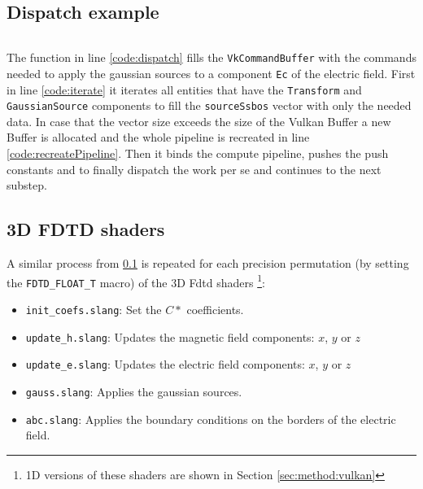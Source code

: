 \documentclass[../main.tex]{subfiles}
\begin{document}
\subsection{Dispatch example} \label{subsection:dispatch}

\inputminted[bgcolor=codeBg, tabsize=4, breaklines=true, linenos=true, escapeinside=||]{cpp}{\subfix{gauss.cpp}}

The function in line \ref{code:dispatch} fills the \texttt{VkCommandBuffer} with the commands needed to apply the gaussian sources to a component \texttt{Ec} of the electric field.
First in line \ref{code:iterate} it iterates all entities that have the \texttt{Transform} and \texttt{GaussianSource} components to fill the \texttt{sourceSsbos} vector with only the needed data.
In case that the vector size exceeds the size of the Vulkan Buffer a new Buffer is allocated and the whole pipeline is recreated in line \ref{code:recreatePipeline}.
Then it binds the compute pipeline, pushes the push constants and to finally dispatch the work per se and continues to the next substep.

\subsection{3D FDTD shaders}

A similar process from \ref{subsection:dispatch} is repeated for each precision permutation (by setting the \texttt{FDTD\_FLOAT\_T} macro) of the 3D Fdtd shaders \footnote{1D versions of these shaders are shown in Section \ref{sec:method:vulkan}}:

\begin{itemize}
    \item \texttt{init\_coefs.slang}: Set the $C*$ coefficients.
    \item \texttt{update\_h.slang}: Updates the magnetic field components: $x$, $y$ or $z$
    \item \texttt{update\_e.slang}: Updates the electric field components: $x$, $y$ or $z$
    \item \texttt{gauss.slang}: Applies the gaussian sources.
    \item \texttt{abc.slang}: Applies the boundary conditions on the borders of the electric field.
\end{itemize}
\end{document}
